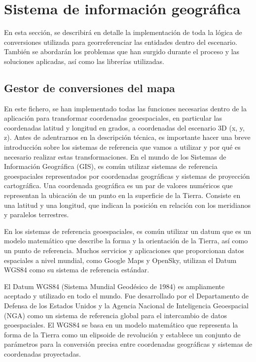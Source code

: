 \documentclass[a4paper, 11pt]{book}
\begin{document}
\clearpage
\section{Sistema de información geográfica}
\label{sec:gis}
En esta sección, se describirá en detalle la implementación de toda la lógica de conversiones utilizada para georreferenciar las entidades dentro del escenario. También se abordarán los problemas que han surgido durante el proceso y las soluciones aplicadas, así como las librerías utilizadas.
\subsection{Gestor de conversiones del mapa}
\label{subsec:mapConversion}
En este fichero, se han implementado todas las funciones necesarias dentro de la aplicación para transformar coordenadas geoespaciales, en particular las coordenadas latitud y longitud en grados, a coordenadas del escenario 3D (x, y, z).
Antes de adentrarnos en la descripción técnica, es importante hacer una breve introducción sobre los sistemas de referencia que vamos a utilizar y por qué es necesario realizar estas transformaciones.
En el mundo de los Sistemas de Información Geográfica (GIS), es común utilizar sistemas de referencia geoespaciales representados por coordenadas geográficas y sistemas de proyección cartográfica.
Una coordenada geográfica es un par de valores numéricos que representan la ubicación de un punto en la superficie de la Tierra. Consiste en una latitud y una longitud, que indican la posición en relación con los meridianos y paralelos terrestres.

En los sistemas de referencia geoespaciales, es común utilizar un datum que es un modelo matemático que describe la forma y la orientación de la Tierra, así como un punto de referencia. Muchos servicios y aplicaciones que proporcionan datos espaciales a nivel mundial, como Google Maps y OpenSky, utilizan el Datum WGS84 como su sistema de referencia estándar.

El Datum WGS84 (Sistema Mundial Geodésico de 1984) es ampliamente aceptado y utilizado en todo el mundo. Fue desarrollado por el Departamento de Defensa de los Estados Unidos y la Agencia Nacional de Inteligencia Geoespacial (NGA) como un sistema de referencia global para el intercambio de datos geoespaciales. El WGS84 se basa en un modelo matemático que representa la forma de la Tierra como un elipsoide de revolución y establece un conjunto de parámetros para la conversión precisa entre coordenadas geográficas y sistemas de coordenadas proyectadas.
\end{document}
